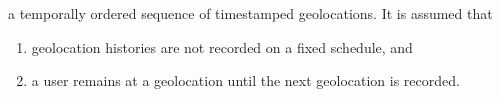 a temporally ordered sequence of timestamped geolocations. It is assumed that
	\begin{enumerate}
		\item geolocation histories are not recorded on a fixed schedule, and \label{assume:sched}
		\item a user remains at a geolocation until the next geolocation is recorded. \label{assume:static}
	\end{enumerate}

